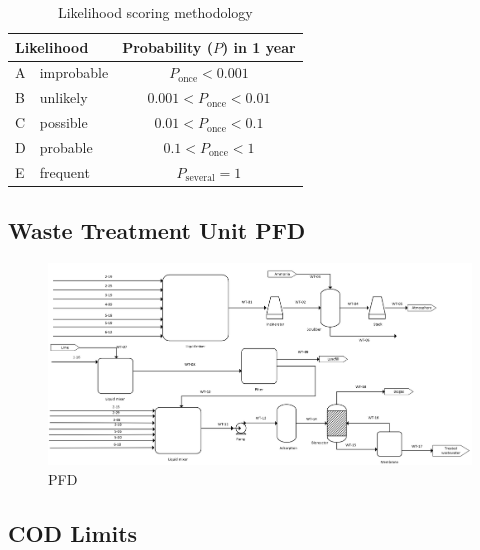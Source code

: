 \begin{table}[H]
\centering
\caption{Likelihood scoring methodology}
\label{tab:likelihood-methodology}
\begin{tabular}{@{}llc@{}}
\toprule
\multicolumn{2}{l}{Likelihood} & Probability ($P$) in 1 year              \\ \midrule
A & improbable & $         P_\mathrm{once} < 0.001 $ \\
B & unlikely   & $ 0.001 < P_\mathrm{once} < 0.01  $ \\
C & possible   & $ 0.01  < P_\mathrm{once} < 0.1   $ \\
D & probable   & $ 0.1   < P_\mathrm{once} < 1     $ \\
E & frequent   & $         P_\mathrm{several} = 1  $ \\ \bottomrule
\end{tabular}
\end{table}

\subsection{Waste Treatment Unit PFD}
\label{app:wastePFD}


\begin{landscape}
\begin{figure}[H]%
\includegraphics[width=\linewidth]{chapters/5-safety-layout-environment/figures/Waste_PFD.png}
\caption{PFD}
\label{fig:wastePFD}
\end{figure}
\end{landscape}


\subsection{COD Limits}
\label{app:COD}

